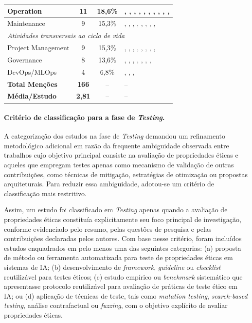 \begin{table}[htbp]
\begin{tabular}{lccp{6.5cm}}
\hline
Operation & 11 & 18,6\% & \cite{S001}, \cite{S003}, \cite{S005}, \cite{S013}, \cite{S014}, \cite{S027}, \cite{S038}, \cite{S045}, \cite{S048}, \cite{S055}, \cite{S057} \\
\hline
Maintenance & 9 & 15,3\% & \cite{S001}, \cite{S013}, \cite{S014}, \cite{S030}, \cite{S038}, \cite{S041}, \cite{S046}, \cite{S051}, \cite{S055} \\
\hline
\multicolumn{4}{l}{\textit{Atividades transversais ao ciclo de vida}} \\
\hline
Project Management & 9 & 15,3\% & \cite{S011}, \cite{S017}, \cite{S022}, \cite{S025}, \cite{S028}, \cite{S035}, \cite{S038}, \cite{S042}, \cite{S046} \\
\hline
Governance & 8 & 13,6\% & \cite{S013}, \cite{S014}, \cite{S015}, \cite{S016}, \cite{S019}, \cite{S020}, \cite{S028}, \cite{S033} \\
\hline
DevOps/MLOps & 4 & 6,8\% & \cite{S021}, \cite{S038}, \cite{S044}, \cite{S045} \\
\hline
\textbf{Total Menções} & \textbf{166} & -- & -- \\
\textbf{Média/Estudo} & \textbf{2,81} & -- & -- \\
\hline
\end{tabular}
\end{table}

\paragraph{Critério de classificação para a fase de \textit{Testing}.}

A categorização dos estudos na fase de \textit{Testing} demandou um refinamento metodológico adicional em razão da frequente ambiguidade observada entre trabalhos cujo objetivo principal consiste na avaliação de propriedades éticas e aqueles que empregam testes apenas como mecanismo de validação de outras contribuições, como técnicas de mitigação, estratégias de otimização ou propostas arquiteturais. Para reduzir essa ambiguidade, adotou-se um critério de classificação mais restritivo.

Assim, um estudo foi classificado em \textit{Testing} apenas quando a avaliação de propriedades éticas constituía explicitamente seu foco principal de investigação, conforme evidenciado pelo resumo, pelas questões de pesquisa e pelas contribuições declaradas pelos autores. Com base nesse critério, foram incluídos estudos enquadrados em pelo menos uma das seguintes categorias: (a) proposta de método ou ferramenta automatizada para teste de propriedades éticas em sistemas de IA; (b) desenvolvimento de \textit{framework}, \textit{guideline} ou \textit{checklist} reutilizável para testes éticos; (c) estudo empírico ou \textit{benchmark} sistemático que apresentasse protocolo reutilizável para avaliação de práticas de teste ético em IA; ou (d) aplicação de técnicas de teste, tais como \textit{mutation testing}, \textit{search-based testing}, análise contrafactual ou \textit{fuzzing}, com o objetivo explícito de avaliar propriedades éticas.

